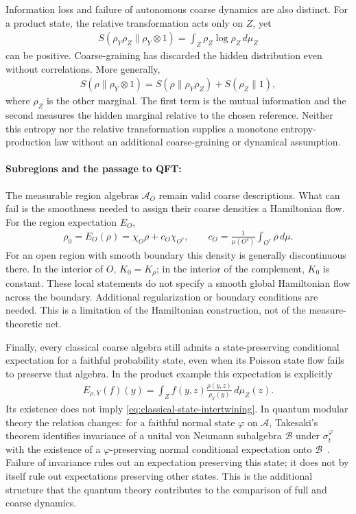 \documentclass[a4paper,11pt]{article}
\theoremstyle{definition}
\newcommand{\mA}{\mathcal{A}}
\newcommand{\mB}{\mathcal{B}}
\begin{document}
Information loss and failure of autonomous coarse dynamics are also distinct. For a product state, the relative transformation acts only on $Z$, yet
\begin{align}
    S(\rho_Y\rho_Z\|\rho_Y\otimes1)
    =\int_Z\rho_Z\log\rho_Z\,d\mu_Z
\end{align}
can be positive. Coarse-graining has discarded the hidden distribution even without correlations. More generally,
\begin{align}
    S(\rho\|\rho_Y\otimes1)
    =S(\rho\|\rho_Y\rho_Z)+S(\rho_Z\|1),
\end{align}
where $\rho_Z$ is the other marginal. The first term is the mutual information and the second measures the hidden marginal relative to the chosen reference. Neither this entropy nor the relative transformation supplies a monotone entropy-production law without an additional coarse-graining or dynamical assumption.

\paragraph{Subregions and the passage to QFT:}
The measurable region algebras $\mA_O$ remain valid coarse descriptions. What can fail is the smoothness needed to assign their coarse densities a Hamiltonian flow. For the region expectation $E_O$,
\begin{align}
    \rho_0=E_O(\rho)=\chi_O\rho+c_O\chi_{O^c},\qquad
    c_O=\frac{1}{\mu(O^c)}\int_{O^c}\rho\,d\mu.
\end{align}
For an open region with smooth boundary this density is generally discontinuous there. In the interior of $O$, $K_0=K_\rho$; in the interior of the complement, $K_0$ is constant. These local statements do not specify a smooth global Hamiltonian flow across the boundary. Additional regularization or boundary conditions are needed. This is a limitation of the Hamiltonian construction, not of the measure-theoretic net.

Finally, every classical coarse algebra still admits a state-preserving conditional expectation for a faithful probability state, even when its Poisson state flow fails to preserve that algebra. In the product example this expectation is explicitly
\begin{align}
    E_{\rho,Y}(f)(y)=\int_Z f(y,z)\frac{\rho(y,z)}{\rho_Y(y)}\,d\mu_Z(z).
\end{align}
Its existence does not imply \eqref{eq:classical-state-intertwining}. In quantum modular theory the relation changes: for a faithful normal state $\varphi$ on $\mA$, Takesaki's theorem identifies invariance of a unital von Neumann subalgebra $\mB$ under $\sigma_t^\varphi$ with the existence of a $\varphi$-preserving normal conditional expectation onto $\mB$~\cite{Takesaki1972}. Failure of invariance rules out an expectation preserving this state; it does not by itself rule out expectations preserving other states. This is the additional structure that the quantum theory contributes to the comparison of full and coarse dynamics.
\end{document}
